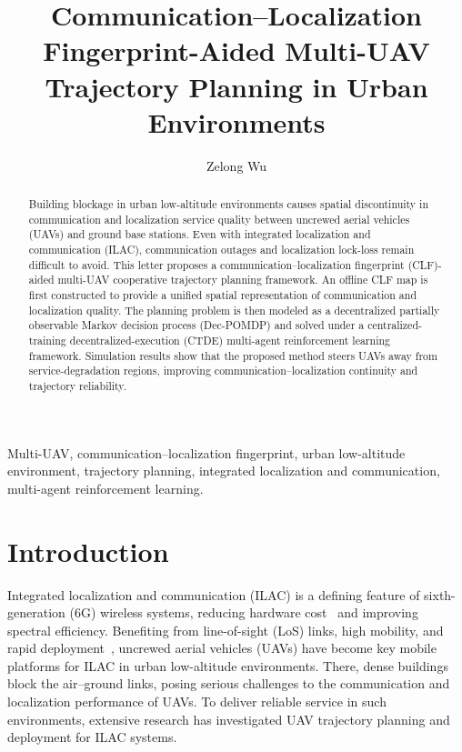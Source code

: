 \documentclass[lettersize,journal]{IEEEtran}
\begin{document}
\title{Communication--Localization Fingerprint-Aided Multi-UAV Trajectory Planning in Urban Environments}

\author{Zelong Wu}

\maketitle

\begin{abstract}
Building blockage in urban low-altitude environments causes spatial discontinuity in communication and localization service quality between uncrewed aerial vehicles (UAVs) and ground base stations. Even with integrated localization and communication (ILAC), communication outages and localization lock-loss remain difficult to avoid. This letter proposes a communication--localization fingerprint (CLF)-aided multi-UAV cooperative trajectory planning framework. An offline CLF map is first constructed to provide a unified spatial representation of communication and localization quality. The planning problem is then modeled as a decentralized partially observable Markov decision process (Dec-POMDP) and solved under a centralized-training decentralized-execution (CTDE) multi-agent reinforcement learning framework. Simulation results show that the proposed method steers UAVs away from service-degradation regions, improving communication--localization continuity and trajectory reliability.
\end{abstract}

\begin{IEEEkeywords}
Multi-UAV, communication--localization fingerprint, urban low-altitude environment, trajectory planning, integrated localization and communication, multi-agent reinforcement learning.
\end{IEEEkeywords}

\section{Introduction}

Integrated localization and communication (ILAC) is a defining feature of sixth-generation (6G) wireless systems, reducing hardware cost~\cite{ref1} and improving spectral efficiency. Benefiting from line-of-sight (LoS) links, high mobility, and rapid deployment~\cite{ref2,ref3,ref4,ref5,ref6}, uncrewed aerial vehicles (UAVs) have become key mobile platforms for ILAC in urban low-altitude environments. There, dense buildings block the air--ground links, posing serious challenges to the communication and localization performance of UAVs. To deliver reliable service in such environments, extensive research has investigated UAV trajectory planning and deployment for ILAC systems.
\end{document}
